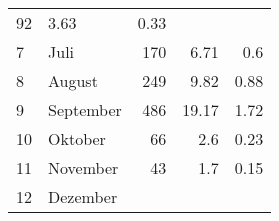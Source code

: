 \begin{longtable}{lXrrr}
       \num{92} &
       \num[round-mode=places,round-precision=2]{3.63} &
         \num[round-mode=places,round-precision=2]{0.33} \\

     7 &
     \multicolumn{1}{X}{ Juli   } &


       \num{170} &
       \num[round-mode=places,round-precision=2]{6.71} &
         \num[round-mode=places,round-precision=2]{0.6} \\

     8 &
     \multicolumn{1}{X}{ August   } &


       \num{249} &
       \num[round-mode=places,round-precision=2]{9.82} &
         \num[round-mode=places,round-precision=2]{0.88} \\

     9 &
     \multicolumn{1}{X}{ September   } &


       \num{486} &
       \num[round-mode=places,round-precision=2]{19.17} &
         \num[round-mode=places,round-precision=2]{1.72} \\

     10 &
     \multicolumn{1}{X}{ Oktober   } &


       \num{66} &
       \num[round-mode=places,round-precision=2]{2.6} &
         \num[round-mode=places,round-precision=2]{0.23} \\

     11 &
     \multicolumn{1}{X}{ November   } &


       \num{43} &
       \num[round-mode=places,round-precision=2]{1.7} &
         \num[round-mode=places,round-precision=2]{0.15} \\

     12 &
     \multicolumn{1}{X}{ Dezember   } &



\end{longtable}
